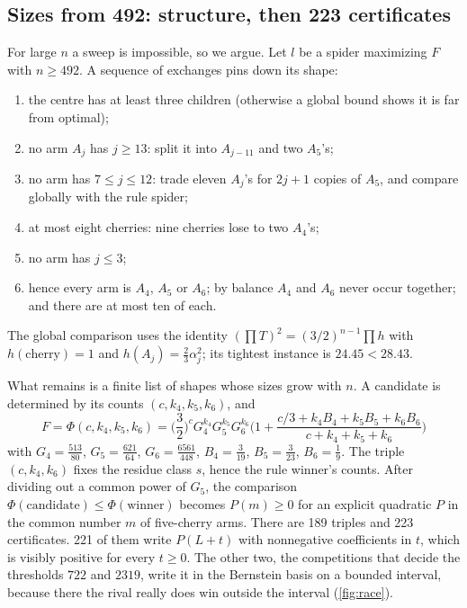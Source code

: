 \documentclass[11pt]{article}
\theoremstyle{definition}
\begin{document}
\subsection{Sizes from 492: structure, then 223 certificates}

For large $n$ a sweep is impossible, so we argue. Let $l$ be a spider maximizing $F$ with $n\ge492$. A
sequence of exchanges pins down its shape:
\begin{enumerate}
\item the centre has at least three children (otherwise a global bound shows it is far from optimal);
\item no arm $A_j$ has $j\ge13$: split it into $A_{j-11}$ and two $A_5$'s;
\item no arm has $7\le j\le12$: trade eleven $A_j$'s for $2j+1$ copies of $A_5$, and compare globally
  with the rule spider;
\item at most eight cherries: nine cherries lose to two $A_4$'s;
\item no arm has $j\le3$;
\item hence every arm is $A_4$, $A_5$ or $A_6$; by balance $A_4$ and $A_6$ never occur together; and there
  are at most ten of each.
\end{enumerate}
The global comparison uses the identity $(\prod T)^2=(3/2)^{n-1}\prod h$ with $h(\text{cherry})=1$ and
$h(A_j)=\tfrac23\alpha_j^2$; its tightest instance is $24.45<28.43$.

What remains is a finite list of shapes whose sizes grow with $n$. A candidate is determined by its
counts $(c,k_4,k_5,k_6)$, and
\[
  F=\Phi(c,k_4,k_5,k_6)=\Big(\frac32\Big)^{c}G_4^{k_4}G_5^{k_5}G_6^{k_6}
  \Big(1+\frac{c/3+k_4B_4+k_5B_5+k_6B_6}{c+k_4+k_5+k_6}\Big)
\]
with $G_4=\tfrac{513}{80}$, $G_5=\tfrac{621}{64}$, $G_6=\tfrac{6561}{448}$, $B_4=\tfrac3{19}$,
$B_5=\tfrac3{23}$, $B_6=\tfrac19$. The triple $(c,k_4,k_6)$ fixes the residue class $s$, hence the rule
winner's counts. After dividing out a common power of $G_5$, the comparison
$\Phi(\text{candidate})\le\Phi(\text{winner})$ becomes $P(m)\ge0$ for an explicit quadratic $P$ in the
common number $m$ of five-cherry arms. There are 189 triples and 223 certificates. 221 of them write
$P(L+t)$ with nonnegative coefficients in $t$, which is visibly positive for every $t\ge0$. The other
two, the competitions that decide the thresholds $722$ and $2319$, write it in the Bernstein basis on a
bounded interval, because there the rival really does win outside the interval (\cref{fig:race}).
\end{document}
